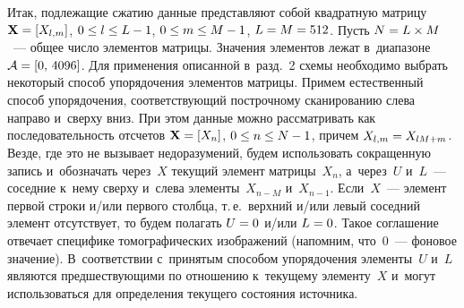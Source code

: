 \begin{multicols}{2}
        


Итак, подлежащие сжатию данные представляют собой квадратную 
матрицу $\mathbf{X}\hm=[X_{l,m}]$, $0\hm\le l\hm\le L\hm-1$, 
$0\hm\le m\hm\le M\hm-1$, $L\hm=M\hm=512$. Пусть $N\hm=L\times M$~--- 
общее число элементов мат\-ри\-цы. Значения элементов лежат в~диапазоне 
${\cal A}\hm=[0,\,4096]$. Для применения описанной в~разд.~2
схемы необходимо выбрать некоторый способ упорядочения элементов 
мат\-ри\-цы. Примем естественный способ упорядочения, соответствующий построчному 
сканированию слева направо и~сверху вниз. При этом данные можно рассматривать 
как последовательность отсчетов $\mathbf{X}\hm=[X_{n}]$,  $0\hm\le n\hm\le N\hm-1$, 
причем $X_{l,m}\hm=X_{lM+m}$. Везде, где это не вызывает недоразумений, 
будем использовать сокращенную запись и~обозначать через~$X$ текущий элемент 
мат\-ри\-цы~$X_n$, а~через~$U$ и~$L$~--- соседние к~нему сверху и~слева 
элементы~$X_{n-M}$ и~$X_{n-1}$. Если~$X$~--- элемент первой строки и/или первого 
столбца, т.\,е.\ верхний и/или левый соседний элемент отсутствует, то будем полагать 
$U\hm=0$ и/или $L\hm=0$. Такое соглашение отвечает специфике томографических 
изоб\-ра\-же\-ний (на\-пом\-ним, что~0~--- фоновое значение). В~соответствии с~принятым 
способом упорядочения элементы~$U$ и~$L$ являются предшествующими по 
отношению к~текущему элементу~$X$  и~могут использоваться для определения 
текущего состояния ис\-точ\-ника.
{

}

\begin{figure*} %
\vspace*{1pt}
\begin{center}
\mbox{%
\epsfxsize=148.291mm
}
\end{center}
\vspace*{-9pt}
\label{fig2}
\end{figure*}



\end{multicols}
